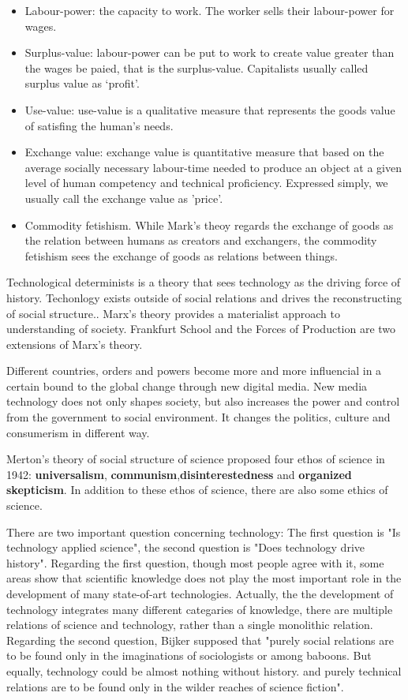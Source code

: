 \documentclass[letterpaper,12pt]{article}
\begin{document}
\begin{itemize}
  \item Labour-power: the capacity to work. The worker sells their labour-power for wages.
  \item Surplus-value: labour-power can be put to work to create value greater than the wages be paied, that is the surplus-value.
  Capitalists usually called surplus value as ‘profit’.
  \item Use-value: use-value is a qualitative measure that represents the goods value of satisfing the human's needs.
  \item Exchange value: exchange value is quantitative measure that 
  based on the average socially necessary labour-time needed to produce an object at a given level of human competency and technical proficiency\cite{textbook}.
  Expressed simply, we usually call the exchange value as 'price'.
  \item Commodity fetishism. 
  While Mark's theoy regards the exchange of goods as the relation between humans as creators and exchangers, 
  the commodity fetishism sees the exchange of goods as relations between things.
\end{itemize}

Technological determinists is a theory that sees technology as the driving force of history.
Techonlogy exists outside of social relations and drives the reconstructing of social structure.\cite{textbook}.
Marx’s theory provides a materialist approach to understanding of society.
Frankfurt School and the Forces of Production are two extensions of Marx's theory.


Different countries, orders and powers become more and more influencial in a certain bound to the global 
change through new digital media. 
New media technology does not only shapes society, but also increases the power and control from the government 
to social environment.
It changes the politics, culture and consumerism in different way.


Merton's theory of social structure of science proposed four ethos of science in 1942:
\textbf{universalism}, \textbf{communism},\textbf{disinterestedness} and \textbf{organized skepticism}.
In addition to these ethos of science, there are also some ethics of science.

There are two important question concerning technology:
The first question is "Is technology applied science",
the second question is "Does technology drive history".
Regarding the first question, though most people agree with it,
some areas show that scientific knowledge does not play the most important 
role in the development of many state-of-art technologies.
Actually, the the development of technology integrates many different categaries of knowledge, 
there are multiple relations of science and technology, rather than a single monolithic relation.
Regarding the second question, Bijker supposed that 
"purely social relations are to be found only in the imaginations of sociologists or among baboons. 
But equally, technology could be almost nothing without history.
and purely technical relations are to be found only in the wilder reaches of science fiction"\cite{pinch1984social}.
\end{document}
